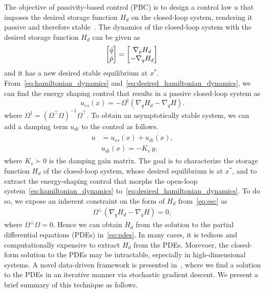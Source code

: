 The objective of passivity-based control (PBC) is to design a control law $u$
that imposes the desired storage function $H_d$ on the closed-loop system,
rendering it passive and therefore stable~\cite{van2000l2}.
%
The dynamics of the closed-loop system with the desired storage function $H_d$ can be given as
\begin{align}
  \begin{split}  
    \begin{bmatrix}\dot{q} \\ \dot{p}\end{bmatrix} &= \begin{bmatrix}\nabla_pH_d \\ -\nabla_qH_d\end{bmatrix}\, \\
  \end{split}
  \label{eq:desired_hamiltonian_dynamics}
\end{align}
\noindent and it has a new desired stable equilibrium at $x^*$.
%
From~\eqref{eq:hamiltonian_dynamics}
and~\eqref{eq:desired_hamiltonian_dynamics}, we can find the energy shaping
control that results in a passive closed-loop system as
%
\begin{equation}
  u_{es}(x) =  -\Omega^{\dagger} \left( \nabla_q H_d - \nabla_q H \right).
  \label{eq:esc}
\end{equation}
\noindent where $\Omega^\dagger = \left( \Omega^\top \Omega  \right)^{-1}
\Omega^\top$. To obtain an asymptotically stable system, we can add a
damping term $u_{di}$ to the control as follows.
\begin{align}
  \begin{split} 
    u &= u_{es}(x) + u_{di}(x), \\
    &u_{di}(x) = - K_{v} \, y,
  \end{split}
  \label{eq:damping_and_es_control}
\end{align}
\noindent where $K_v \succ 0$ is the damping gain matrix.
%
The goal is to characterize the storage function $H_d$ of the closed-loop
system, whose desired equilibrium is at $x^*$, and to extract the energy-shaping
control that morphs the open-loop system~\eqref{eq:hamiltonian_dynamics}
to~\eqref{eq:desired_hamiltonian_dynamics}.
%
To do so, we expose an inherent constraint on the form of $H_d$ from~\eqref{eq:esc} as
\begin{align}
  \Omega^\bot \left( \nabla_q H_d - \nabla_q H \right) = 0,
    \label{eq:pdes}
\end{align}
where $\Omega^\perp \Omega = 0$. 
%
Hence we can obtain $H_d$ from the solution to the partial differential
equations (PDEs) in~\eqref{eq:pdes}.
%
In many cases, it is tedious and computationally expensive to extract $H_d$ from
the PDEs. Morevoer, the closed-form solution to the PDEs may be intractable,
especially in high-dimensional systems.
%
A novel data-driven framework is presented in~\cite{ashenafi2022robust,
sirichotiyakul2022data, acc}, where we find a solution to the PDEs in an
iterative manner via stochastic gradient descent.
%
We present a brief summary of this technique as follows.

